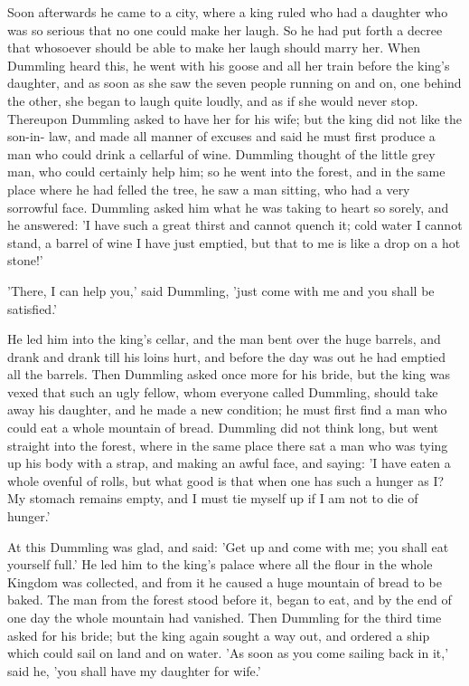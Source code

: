 \documentclass[12pt]{book}
\begin{document}
Soon afterwards he came to a city, where a king ruled who had a
daughter who was so serious that no one could make her laugh. So he
had put forth a decree that whosoever should be able to make her laugh
should marry her. When Dummling heard this, he went with his goose and
all her train before the king's daughter, and as soon as she saw the
seven people running on and on, one behind the other, she began to
laugh quite loudly, and as if she would never stop. Thereupon Dummling
asked to have her for his wife; but the king did not like the son-in-
law, and made all manner of excuses and said he must first produce a
man who could drink a cellarful of wine. Dummling thought of the
little grey man, who could certainly help him; so he went into the
forest, and in the same place where he had felled the tree, he saw a
man sitting, who had a very sorrowful face. Dummling asked him what he
was taking to heart so sorely, and he answered: 'I have such a great
thirst and cannot quench it; cold water I cannot stand, a barrel of
wine I have just emptied, but that to me is like a drop on a hot
stone!'

'There, I can help you,' said Dummling, 'just come with me and you
shall be satisfied.'

He led him into the king's cellar, and the man bent over the huge
barrels, and drank and drank till his loins hurt, and before the day
was out he had emptied all the barrels. Then Dummling asked once more
for his bride, but the king was vexed that such an ugly fellow, whom
everyone called Dummling, should take away his daughter, and he made a
new condition; he must first find a man who could eat a whole mountain
of bread. Dummling did not think long, but went straight into the
forest, where in the same place there sat a man who was tying up his
body with a strap, and making an awful face, and saying: 'I have eaten
a whole ovenful of rolls, but what good is that when one has such a
hunger as I? My stomach remains empty, and I must tie myself up if I
am not to die of hunger.'

At this Dummling was glad, and said: 'Get up and come with me; you
shall eat yourself full.' He led him to the king's palace where all
the flour in the whole Kingdom was collected, and from it he caused a
huge mountain of bread to be baked. The man from the forest stood
before it, began to eat, and by the end of one day the whole mountain
had vanished. Then Dummling for the third time asked for his bride;
but the king again sought a way out, and ordered a ship which could
sail on land and on water. 'As soon as you come sailing back in it,'
said he, 'you shall have my daughter for wife.'
\end{document}
